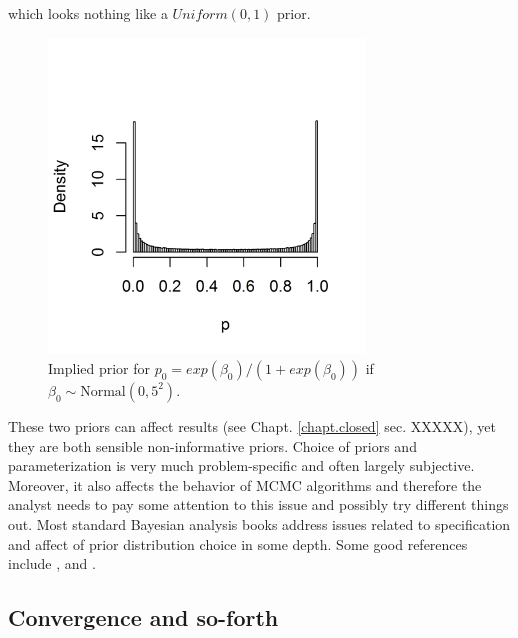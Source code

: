 which looks nothing like a $Uniform(0,1)$ prior.
\begin{figure}[htp]
\begin{center}
\includegraphics[height=3.3in]{Ch2/figs/implied_prior}
\end{center}
\caption{Implied prior for $p_{0} = exp(\beta_0)/(1+exp(\beta_0))$ 
if $\beta_0 \sim \mbox{Normal}(0, 5^2)$.}
\label{glms.fig.impliedprior}
\end{figure}
These two priors can
affect results (see Chapt. \ref{chapt.closed} sec. XXXXX), yet they are both 
sensible
non-informative priors. Choice of priors and parameterization is
very much problem-specific and often largely subjective. Moreover, it
also affects the behavior of MCMC algorithms and therefore the analyst
needs to pay some attention to this issue and possibly try different
things out.
Most standard Bayesian analysis books address issues related to specification and
affect of prior distribution choice in some depth. Some good references include 
\citet{kass_wasserman:1996}, \citet{gelman:2006} and \citet{link_barker:2010}.


\subsection{Convergence and so-forth}
\label{glms.sec.convergence}

